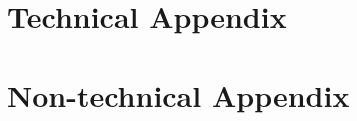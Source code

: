   \section{Technical Appendix}
\label{sec:Tec_App}


\section{Non-technical Appendix}
\label{sec:NonTec_App}









